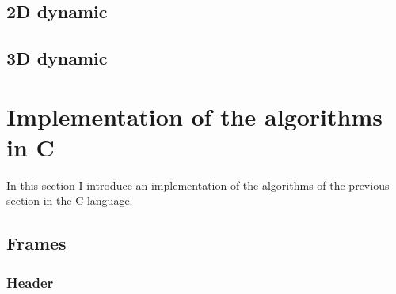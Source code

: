 \documentclass[12pt, a4paper]{article}
\begin{document}
\begin{scriptsize}
\begin{ttfamily}

\end{ttfamily}
\end{scriptsize}

\subsection{2D dynamic}

\begin{scriptsize}
\begin{ttfamily}

\end{ttfamily}
\end{scriptsize}

\subsection{3D dynamic}

\begin{scriptsize}
\begin{ttfamily}

\end{ttfamily}
\end{scriptsize}

\section{Implementation of the algorithms in C}

In this section I introduce an implementation of the algorithms of the previous section in the C language.\\

\subsection{Frames}

\subsubsection{Header}

\begin{scriptsize}
\begin{ttfamily}

\end{ttfamily}
\end{scriptsize}
\end{document}
